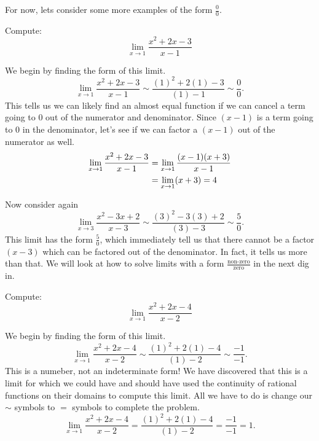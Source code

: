 \documentclass{ximera}
\begin{document}
For now, lets consider some more examples of the form $\frac{0}{0}$.

\begin{example}
  Compute:
  \[
  \lim_{x\to1}\frac{x^2+2x-3}{x-1}
  \]
  \begin{explanation}
    We begin by finding the form of this limit.
    \[
    \lim_{x\to1}\frac{x^2+2x-3}{x-1} \sim \frac{(1)^2+2(1)-3}{(1)-1} \sim
    \frac{0}{0}.
    \]
    This tells us we can likely find an almost equal function if we can
    cancel a term going to $0$ out of the numerator and denominator.  Since
    $(x-1)$ is a term going to $0$ in the denominator, let's see if we can
    factor a $(x-1)$ out of the numerator as well.
    \begin{align*}
      \lim_{x\to1}{x^2+2x-3\over x-1}&=\lim_{x\to1}{(x-1)(x+3)\over x-1} \\
      &=\lim_{x\to1}(x+3)=4
    \end{align*}
  \end{explanation}
\end{example}



Now consider again
\[
\lim_{x\to 3}\frac{x^2-3x+2}{x-3} \sim \frac{(3)^2-3(3)+2}{(3)-3} \sim \frac{5}{0}.
\]
This limit has the form $\frac{5}{0}$, which immediately tell us that
there cannot be a factor $(x-3)$ which can be factored out of the
denominator.  In fact, it tells us more than that.  We will look at
how to solve limits with a form $\frac{\text{non-zero}}{\text{zero}}$
in the next dig in.


\begin{example}
  Compute:
  \[
  \lim_{x\to1}\frac{x^2+2x-4}{x-2}
  \]
\begin{explanation}
  We begin by finding the form of this
  limit.
  \[
  \lim_{x\to1}\frac{x^2+2x-4}{x-2} \sim\frac{(1)^2+2(1)-4}{(1)-2} \sim \frac{-1}{-1}.
  \]
  This is a numeber, not an indeterminate form! We have discovered
  that this is a limit for which we could have and should have used
  the continuity of rational functions on their domains to compute
  this limit.  All we have to do is change our $\sim$ symbols to $=$
  symbols to complete the problem.
  \[
  \lim_{x\to1}\frac{x^2+2x-4}{x-2} = \frac{(1)^2+2(1)-4}{(1)-2} =
  \frac{-1}{-1} =1.
  \]
\end{explanation}
\end{example}
\end{document}
